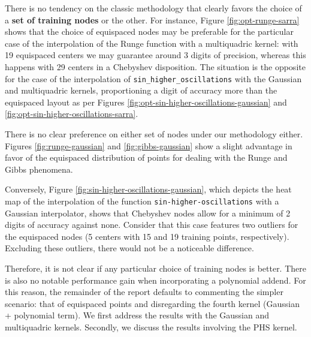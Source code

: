 \documentclass[12pt]{report} %
\begin{document}
There is no tendency on the classic methodology
that clearly favors the choice of a \textbf{set of training nodes} or the other. For instance,
Figure \ref{fig:opt-runge-sarra} shows that the choice of equispaced nodes may
be preferable for the particular case of the interpolation of the
Runge function with a multiquadric kernel: with 19 equispaced centers we may
guarantee around 3 digits of precision, whereas this happens with 29 centers
in a Chebyshev disposition.
The situation is the opposite for the case of the interpolation of
\texttt{sin\_higher\_oscillations} with the Gaussian and multiquadric
kernels, proportioning a digit of accuracy more than the equispaced layout as per
Figures \ref{fig:opt-sin-higher-oscillations-gaussian} and
\ref{fig:opt-sin-higher-oscillations-sarra}. 

There is no clear preference on either set of nodes under our methodology either. Figures
\ref{fig:runge-gaussian} and \ref{fig:gibbs-gaussian} show a slight advantage
in favor of the equispaced distribution of points for dealing with the Runge
and Gibbs phenomena. %

Conversely, Figure \ref{fig:sin-higher-oscillations-gaussian}, which depicts the heat map of the interpolation of the function \texttt{sin-higher-oscillations} with a Gaussian interpolator, shows that Chebyshev nodes allow for a minimum of 2 digits of accuracy against none. Consider that this case features two outliers for the equispaced nodes (5 centers with 15 and 19 training points, respectively). Excluding these outliers, there would not be a noticeable difference.

Therefore, it is not clear if any particular choice of training nodes is better. There is also no notable performance gain when incorporating a polynomial addend. For this reason, the remainder of the report defaults to commenting the simpler
scenario: that of equispaced points and disregarding the fourth kernel (Gaussian + polynomial term). We first address the results with the Gaussian and multiquadric kernels. Secondly, we discuss the results involving the PHS kernel.
\end{document}
